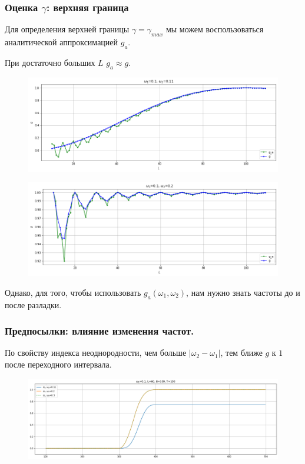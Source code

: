 \documentclass[11pt]{beamer}
\begin{document}
	\begin{frame}
		\frametitle{Оценка $ \gamma $: верхняя граница}
		Для определения верхней границы $ \gamma = \gamma_{max} $ мы можем воспользоваться аналитической аппроксимацией $ g_a $. 
		
		При достаточно больших $ L $ $ g_a \approx g $.
		
		\begin{figure}[b]
			\centering
			\includegraphics[width=0.55\linewidth]{imgs/dynamics_L}
		\end{figure}
		
		\begin{figure}[b]
			\centering
			\includegraphics[width=0.55\linewidth]{imgs/dynamics_L_1}
		\end{figure}
	Однако, для того, чтобы использовать $ g_a(\omega_1, \omega_2) $, нам нужно знать частоты до и после разладки.
	\end{frame}

	\begin{frame}
		\frametitle{Предпосылки: влияние изменения частот.}
		По свойству индекса неоднородности, чем больше $ |\omega_2 - \omega_1| $, тем ближе $ g $ к $ 1 $ после переходного интервала.
		
		\begin{figure}[b]
			\centering
			\includegraphics[width=\linewidth]{imgs/diff_omega_growth}
		\end{figure}
		
	\end{frame}
	
\end{document}
